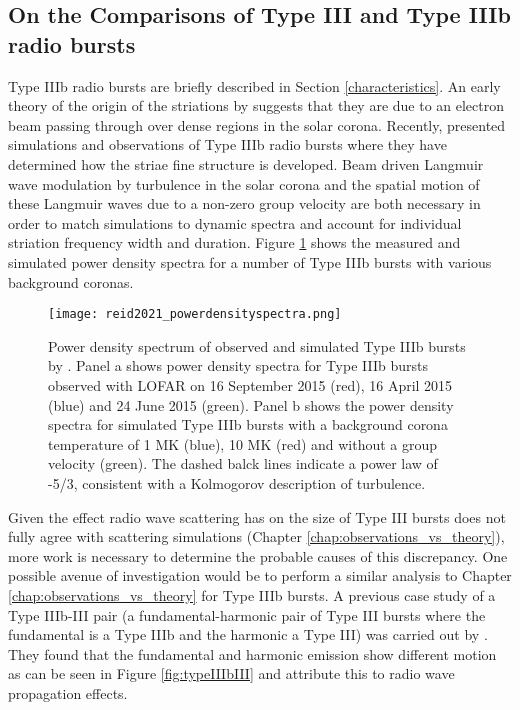 \subsection{On the Comparisons of Type III and Type IIIb radio bursts}
Type IIIb radio bursts are briefly described in Section \ref{characteristics}. An early theory of the origin of the striations by \cite{Takakura1975} suggests that they are due to an electron beam passing through over dense regions in the solar corona. Recently, \cite{Reid2021} presented simulations and observations of Type IIIb radio bursts where they have determined how the striae fine structure is developed. Beam driven Langmuir wave modulation by turbulence in the solar corona and the spatial motion of these Langmuir waves due to a non-zero group velocity are both necessary in order to match simulations to dynamic spectra and account for individual striation frequency width and duration. Figure \ref{fig:reid_pds} shows the measured and simulated power density spectra for a number of Type IIIb bursts with various background coronas.

\begin{figure}[ht]
\centering
\texttt{[image: reid2021\_powerdensityspectra.png]}
\caption[Power density spectrum of observed and simulated Type IIIb bursts by \cite{Reid2021}]{Power density spectrum of observed and simulated Type IIIb bursts by \cite{Reid2021}. Panel a shows power density spectra for Type IIIb bursts observed with LOFAR on 16 September 2015 (red), 16 April 2015 (blue) and 24 June 2015 (green). Panel b shows the power density spectra for simulated Type IIIb bursts with a background corona temperature of 1 MK (blue), 10 MK (red) and without a group velocity (green). The dashed balck lines indicate a power law of -5/3, consistent with a Kolmogorov description of turbulence.}
\label{fig:reid_pds}
\end{figure}

Given the effect radio wave scattering has on the size of Type III bursts does not fully agree with scattering simulations (Chapter \ref{chap:observations_vs_theory}), more work is necessary to determine the probable causes of this discrepancy. One possible avenue of investigation would be to perform a similar analysis to Chapter \ref{chap:observations_vs_theory} for Type IIIb bursts. A previous case study of a Type IIIb-III pair (a fundamental-harmonic pair of Type III bursts where the fundamental is a Type IIIb and the harmonic a Type III) was carried out by \cite{Zhang2020}. They found that the fundamental and harmonic emission show different motion as can be seen in Figure \ref{fig:typeIIIbIII} and attribute this to radio wave propagation effects.

